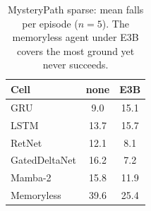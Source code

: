 \begin{table}[t]\centering
\caption{MysteryPath sparse: mean falls per episode ($n{=}5$). The memoryless agent under E3B covers the most ground yet never succeeds.}
\label{tab:falls}\small\begin{tabular}{@{}lcc@{}}\toprule
Cell & none & E3B \\\midrule
GRU & 9.0 & 15.1 \\
LSTM & 13.7 & 15.7 \\
RetNet & 12.1 & 8.1 \\
GatedDeltaNet & 16.2 & 7.2 \\
Mamba-2 & 15.8 & 11.9 \\
Memoryless & 39.6 & 25.4 \\
\bottomrule\end{tabular}\end{table}
